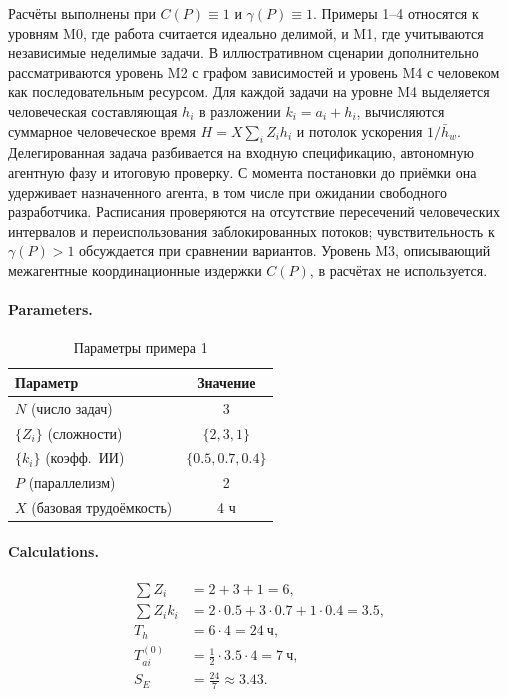 \documentclass[12pt,a4paper]{article}
\theoremstyle{definition}
\begin{document}
Расчёты выполнены при $C(P) \equiv 1$ и $\gamma(P) \equiv 1$. Примеры 1--4 относятся к уровням M0, где работа считается идеально делимой, и M1, где учитываются независимые неделимые задачи. В иллюстративном сценарии дополнительно рассматриваются уровень M2 с графом зависимостей и уровень M4 с человеком как последовательным ресурсом. Для каждой задачи на уровне M4 выделяется человеческая составляющая $h_i$ в разложении $k_i = a_i + h_i$, вычисляются суммарное человеческое время $H = X \sum_i Z_i h_i$ и потолок ускорения $1/\bar{h}_w$. Делегированная задача разбивается на входную спецификацию, автономную агентную фазу и итоговую проверку. С момента постановки до приёмки она удерживает назначенного агента, в том числе при ожидании свободного разработчика. Расписания проверяются на отсутствие пересечений человеческих интервалов и переиспользования заблокированных потоков; чувствительность к $\gamma(P)>1$ обсуждается при сравнении вариантов. Уровень M3, описывающий межагентные координационные издержки $C(P)$, в расчётах не используется.


\paragraph{Parameters.}
\begin{table}[ht!]
\centering
\caption{Параметры примера 1}
\label{tab:example-1-params}
\begin{tabular}{lc}
\toprule
Параметр & Значение \\
\midrule
$N$ (число задач) & 3 \\
$\{Z_i\}$ (сложности) & $\{2, 3, 1\}$ \\
$\{k_i\}$ (коэфф.\ ИИ) & $\{0.5, 0.7, 0.4\}$ \\
$P$ (параллелизм) & 2 \\
$X$ (базовая трудоёмкость) & 4 ч \\
\bottomrule
\end{tabular}
\end{table}

\paragraph{Calculations.}
\begin{align*}
  \sum Z_i &= 2 + 3 + 1 = 6, \\
  \sum Z_i k_i &= 2{\cdot}0.5 + 3{\cdot}0.7 + 1{\cdot}0.4 = 3.5, \\
  T_h &= 6 \cdot 4 = 24~\text{ч}, \\
  T_{ai}^{(0)} &= \frac{1}{2} \cdot 3.5 \cdot 4 = 7~\text{ч}, \\
  S_E &= \frac{24}{7} \approx 3.43.
\end{align*}
\end{document}
